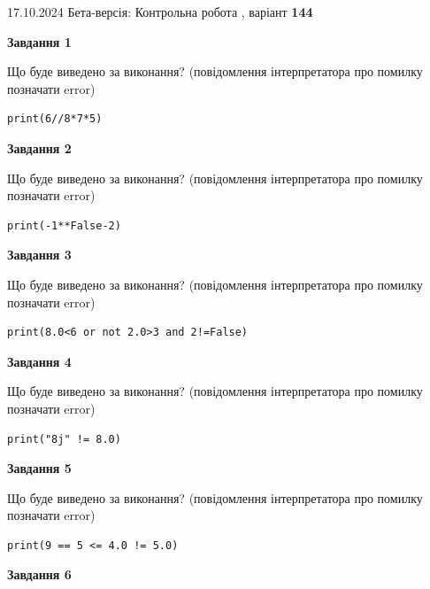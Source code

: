 \documentclass[12pt, ukrainian]{article}
\begin{document}
{\Large{17.10.2024 Бета-версія: Контрольна робота , варіант  \No \textbf { 144 }\par}}
{
\begin {large}
{\begin {center}\textbf{Завдання 1}\end {center}}

Що буде виведено за виконання? (повідомлення інтерпретатора про помилку позначати error)\par
\begin{verbatim}
print(6//8*7*5)
\end{verbatim}

{\begin {center}\textbf{Завдання 2}\end {center}}

Що буде виведено за виконання? (повідомлення інтерпретатора про помилку позначати error)\par
\begin{verbatim}
print(-1**False-2)
\end{verbatim}

{\begin {center}\textbf{Завдання 3}\end {center}}

Що буде виведено за виконання? (повідомлення інтерпретатора про помилку позначати error)\par
\begin{verbatim}
print(8.0<6 or not 2.0>3 and 2!=False)
\end{verbatim}

{\begin {center}\textbf{Завдання 4}\end {center}}

Що буде виведено за виконання? (повідомлення інтерпретатора про помилку позначати error)\par
\begin{verbatim}
print("8j" != 8.0)
\end{verbatim}

{\begin {center}\textbf{Завдання 5}\end {center}}

Що буде виведено за виконання? (повідомлення інтерпретатора про помилку позначати error)\par
\begin{verbatim}
print(9 == 5 <= 4.0 != 5.0)
\end{verbatim}

{\begin {center}\textbf{Завдання 6}\end {center}}


\end{large}}
\end{document}
